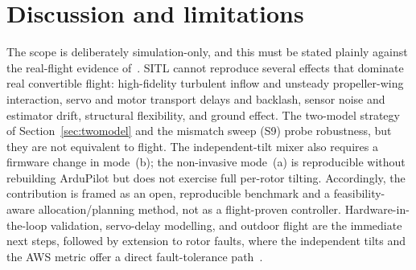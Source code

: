 \documentclass[preprint,3p,11pt]{elsarticle}
\begin{document}
\section{Discussion and limitations}\label{sec:discussion}
The scope is deliberately simulation-only, and this must be stated plainly
against the real-flight evidence of~\cite{bauersfeld2021mpc,allenspach2021nmpc,mancinelli2025unified}.
SITL cannot reproduce several effects that dominate real convertible flight:
high-fidelity turbulent inflow and unsteady propeller-wing interaction,
servo and motor transport delays and backlash, sensor noise and estimator
drift, structural flexibility, and ground effect. The two-model strategy of
Section~\ref{sec:twomodel} and the mismatch sweep (S9) probe robustness, but
they are not equivalent to flight. The independent-tilt mixer also requires a
firmware change in mode~(b); the non-invasive mode~(a) is reproducible
without rebuilding ArduPilot but does not exercise full per-rotor tilting.
Accordingly, the contribution is framed as an open, reproducible benchmark
and a feasibility-aware allocation/planning method, not as a flight-proven
controller. Hardware-in-the-loop validation, servo-delay modelling, and
outdoor flight are the immediate next steps, followed by extension to rotor
faults, where the independent tilts and the AWS metric offer a direct
fault-tolerance path~\cite{yang2026biaxial,santos2021fast,giribet2016tilted}.

\end{document}

